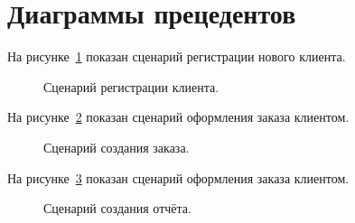 \section{Диаграммы прецедентов}\label{sec:ch2/sec4}
На рисунке~\ref{fig:umls_register_ucesace} показан сценарий регистрации нового клиента.
\begin{figure}[ht]
  \caption{Сценарий регистрации клиента.}\label{fig:umls_register_ucesace}
\end{figure}

На рисунке~\ref{fig:umls_make_order_usecase} показан сценарий оформления заказа клиентом.
\begin{figure}[ht]
  \caption{Сценарий создания заказа.}\label{fig:umls_make_order_usecase}
\end{figure}

На рисунке~\ref{fig:umls_report_request_usecase} показан сценарий оформления заказа клиентом.
\begin{figure}[ht]
  \caption{Сценарий создания отчёта.}\label{fig:umls_report_request_usecase}
\end{figure}